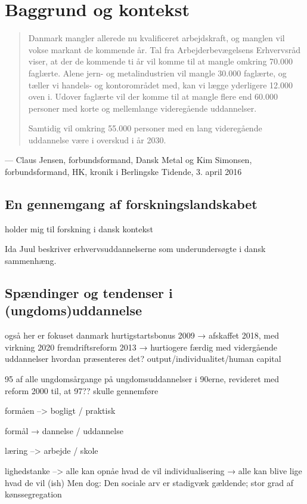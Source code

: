 \section{Baggrund og kontekst}

\begin{quotation}
Danmark mangler allerede nu kvalificeret arbejdskraft, og manglen vil vokse markant de kommende år. Tal fra Arbejderbevægelsens Erhvervsråd viser, at der de kommende ti år vil komme til at mangle omkring 70.000 faglærte. Alene jern- og metalindustrien vil mangle 30.000 faglærte, og tæller vi handels- og kontorområdet med, kan vi lægge yderligere 12.000 oven i. Udover faglærte vil der komme til at mangle flere end 60.000 personer med korte og mellemlange videregående uddannelser.

Samtidig vil omkring 55.000 personer med en lang videregående uddannelse være i overskud i år 2030.
\end{quotation}
--- Claus Jensen, forbundsformand, Dansk Metal og Kim Simonsen, forbundsformand, HK, kronik i Berlingske Tidende, 3. april 2016
\subsection{En gennemgang af forskningslandskabet}

holder mig til forskning i dansk kontekst

Ida Juul  beskriver erhvervsuddannelserne som underundersøgte i dansk sammenhæng.


\subsection{Spændinger og tendenser i (ungdoms)uddannelse}
også her er fokuset danmark
hurtigstartsbonus 2009 → afskaffet 2018, med virkning 2020
fremdriftsreform 2013 → hurtiogere færdig med vidergående uddannelser
hvordan præsenteres det? output/individualitet/human capital

95 \perc af alle ungdomsårgange på ungdomsuddannelser i 90erne, revideret med reform 2000 til, at 97?? skulle gennemføre

formåen --> bogligt / praktisk

formål → dannelse / uddannelse

læring --> arbejde / skole

lighedstanke --> alle kan opnåe hvad de vil
individualisering → alle kan blive lige hvad de vil (ish)
Men dog: Den sociale arv er stadigvæk gældende; stor grad af kønssegregation


